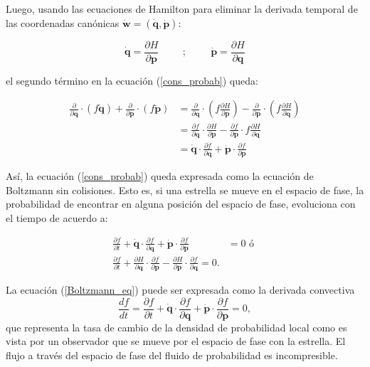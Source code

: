 Luego, usando las ecuaciones de Hamilton para eliminar la derivada temporal de las coordenadas canónicas $ \dot{\textbf{w}} = (\dot{\textbf{q}}, \dot{\textbf{p}})$:

$$ \dot{\textbf{q}} = \frac{\partial H}{\partial \textbf{p}} \hspace{1cm} ; \hspace{1cm}  \dot{\textbf{p}} = \frac{\partial H}{\partial \textbf{q}}    $$

el segundo término en la ecuación (\ref{cons_probab}) queda:

\begin{align*}
\frac{\partial }{\partial \textbf{q}} \cdot (f\dot{\textbf{q}}) + \frac{\partial }{\partial \textbf{p}} \cdot (f\dot{\textbf{p}}) &=  \frac{\partial }{\partial \textbf{q}} \cdot \left (f \frac{\partial H}{\partial \textbf{p}} \right ) -  \frac{\partial }{\partial \textbf{p}} \cdot \left (f \frac{\partial H}{\partial \textbf{q}} \right ) \\
&=  \frac{\partial f }{\partial \textbf{q}} \cdot \frac{\partial H}{\partial \textbf{p}}  -  \frac{\partial f }{\partial \textbf{p}} \cdot f \frac{\partial H}{\partial \textbf{q}} \\
&= \dot{\textbf{q}} \cdot \frac{\partial f }{\partial \textbf{q}} + \dot{\textbf{p}} \cdot \frac{\partial f }{\partial \textbf{p}}
\end{align*} 

Así, la ecuación (\ref{cons_probab}) queda expresada como la ecuación de Boltzmann sin colisiones. Esto es, si una estrella se mueve en el espacio de fase, la probabilidad de encontrar en alguna posición del espacio de fase, evoluciona con el tiempo de acuerdo a:

\begin{align}
\label{Boltzmann_eq}
\frac{\partial f}{\partial t} + \dot{\textbf{q}} \cdot \frac{\partial f }{\partial \textbf{q}} + \dot{\textbf{p}} \cdot \frac{\partial f }{\partial \textbf{p}} &= 0 \textrm{ ó }\\
\label{Boltzmann_eq_gener}
\frac{\partial f}{\partial t} + \frac{\partial H}{\partial \textbf{q}} \cdot \frac{\partial f }{\partial \textbf{p}} - \frac{\partial H}{\partial \textbf{p}} \cdot \frac{\partial f }{\partial \textbf{q}} = 0.
\end{align}

La ecuación (\ref{Boltzmann_eq}) puede ser expresada como la derivada convectiva
$$ \frac{d f}{ d t} = \frac{\partial f}{\partial t} + \dot{\textbf{q}} \cdot \frac{\partial f }{\partial \textbf{q}} + \dot{\textbf{p}} \cdot \frac{\partial f }{\partial \textbf{p}} = 0, $$
que representa la tasa de cambio de la densidad de probabilidad local como es vista por un observador que se mueve por el espacio de fase con la estrella. El flujo a través del espacio de fase del fluido de probabilidad es incompresible.

